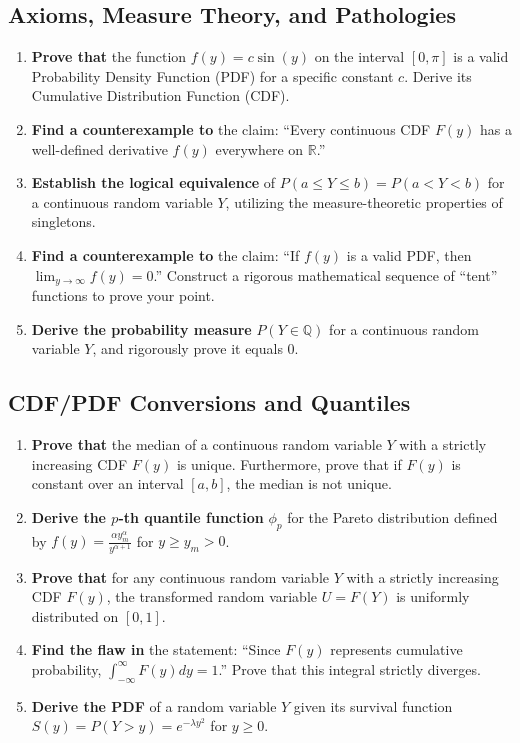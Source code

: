 \documentclass[11pt, a4paper]{article}
\theoremstyle{definition}
\theoremstyle{remark}
\newcommand{\R}{\mathbb{R}}
\newcommand{\Q}{\mathbb{Q}}
\begin{document}
\subsection{Axioms, Measure Theory, and Pathologies}
\begin{enumerate}[label=\textbf{\arabic*.}]
    \item \textbf{Prove that} the function $f(y) = c \sin(y)$ on the interval $[0, \pi]$ is a valid Probability Density Function (PDF) for a specific constant $c$. Derive its Cumulative Distribution Function (CDF).
    \item \textbf{Find a counterexample to} the claim: ``Every continuous CDF $F(y)$ has a well-defined derivative $f(y)$ everywhere on $\R$.''
    \item \textbf{Establish the logical equivalence} of $P(a \le Y \le b) = P(a < Y < b)$ for a continuous random variable $Y$, utilizing the measure-theoretic properties of singletons.
    \item \textbf{Find a counterexample to} the claim: ``If $f(y)$ is a valid PDF, then $\lim_{y \to \infty} f(y) = 0$.'' Construct a rigorous mathematical sequence of ``tent'' functions to prove your point.
    \item \textbf{Derive the probability measure} $P(Y \in \Q)$ for a continuous random variable $Y$, and rigorously prove it equals $0$.
\end{enumerate}

\subsection{CDF/PDF Conversions and Quantiles}
\begin{enumerate}[label=\textbf{\arabic*.}, resume]
    \item \textbf{Prove that} the median of a continuous random variable $Y$ with a strictly increasing CDF $F(y)$ is unique. Furthermore, prove that if $F(y)$ is constant over an interval $[a, b]$, the median is not unique.
    \item \textbf{Derive the $p$-th quantile function} $\phi_p$ for the Pareto distribution defined by $f(y) = \frac{\alpha y_m^\alpha}{y^{\alpha+1}}$ for $y \ge y_m > 0$.
    \item \textbf{Prove that} for any continuous random variable $Y$ with a strictly increasing CDF $F(y)$, the transformed random variable $U = F(Y)$ is uniformly distributed on $[0,1]$.
    \item \textbf{Find the flaw in} the statement: ``Since $F(y)$ represents cumulative probability, $\int_{-\infty}^\infty F(y) dy = 1$.'' Prove that this integral strictly diverges.
    \item \textbf{Derive the PDF} of a random variable $Y$ given its survival function $S(y) = P(Y > y) = e^{-\lambda y^2}$ for $y \ge 0$.
\end{enumerate}
\end{document}

